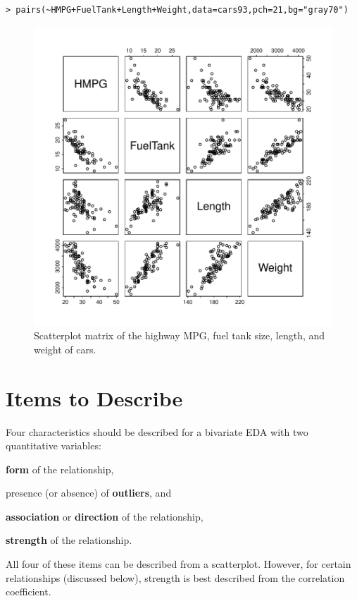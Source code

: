 \documentclass[10pt,openany]{book}\usepackage[]{graphicx}\usepackage[]{color}
\makeatletter
\newenvironment{kframe}{%
 \def\at@end@of@kframe{}%
 \ifinner\ifhmode%
  \def\at@end@of@kframe{\end{minipage}}%
  \begin{minipage}{\columnwidth}%
 \fi\fi%
 \def\FrameCommand##1{\hskip\@totalleftmargin \hskip-\fboxsep
 \colorbox{shadecolor}{##1}\hskip-\fboxsep
     \hskip-\linewidth \hskip-\@totalleftmargin \hskip\columnwidth}%
 \MakeFramed {\advance\hsize-\width
   \@totalleftmargin\z@ \linewidth\hsize
   \@setminipage}}%
 {\par\unskip\endMakeFramed%
 \at@end@of@kframe}
\newenvironment{knitrout}{}{} %
\makeatother
\begin{document}
\begin{knitrout}
\color{fgcolor}\begin{kframe}
\begin{verbatim}
> pairs(~HMPG+FuelTank+Length+Weight,data=cars93,pch=21,bg="gray70")
\end{verbatim}
\end{kframe}\begin{figure}[hbtp]

{\centering \includegraphics[width=.7\linewidth]{Figs/Scatplot4-1} 

}

\caption[Scatterplot matrix of the highway MPG, fuel tank size, length, and weight of cars]{Scatterplot matrix of the highway MPG, fuel tank size, length, and weight of cars.}\label{fig:Scatplot4}
\end{figure}


\end{knitrout}


\section{Items to Describe} \label{sect:BivEDAItems}
Four characteristics should be described for a bivariate EDA with two quantitative variables:
\vspace{-8pt}
\begin{Enumerate}
  \item \textbf{form} of the relationship,
  \item presence (or absence) of \textbf{outliers}, and
  \item \textbf{association} or \textbf{direction} of the relationship,
  \item \textbf{strength} of the relationship.
\end{Enumerate}
\vspace{-8pt}
All four of these items can be described from a scatterplot. However, for certain relationships (discussed below), strength is best described from the correlation coefficient.
\end{document}
